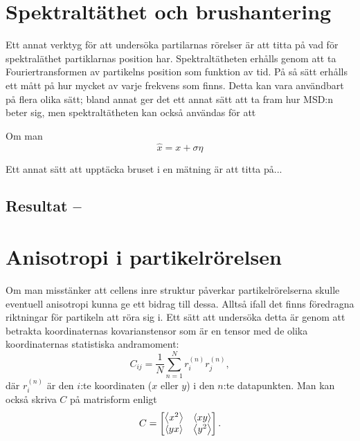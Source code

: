 \section{Spektraltäthet och brushantering}
Ett annat verktyg för att undersöka partilarnas rörelser är att titta på vad för spektraläthet partiklarnas position har. Spektraltätheten erhålls genom att ta Fouriertransformen av partikelns position som funktion av tid. På så sätt erhålls ett mått på hur mycket av varje frekvens som finns. Detta kan vara användbart på flera olika sätt; bland annat ger det ett annat sätt att ta fram hur MSD:n beter sig, men spektraltätheten kan också användas för att 

Om man 
\begin{equation}
\hat{x} = x + \sigma\eta
\end{equation}



Ett annat sätt att upptäcka bruset i en mätning är att titta på...


\subsection{Resultat -- }



\section{Anisotropi i partikelrörelsen}
Om man misstänker att cellens inre struktur påverkar partikelrörelserna skulle eventuell anisotropi kunna ge ett bidrag till dessa. Alltså ifall det finns föredragna riktningar för partikeln att röra sig i. Ett sätt att undersöka detta är genom att betrakta koordinaternas kovarianstensor som är en tensor med de olika koordinaternas statistiska andramoment:
\begin{equation}
C_{ij} = \frac{1}{N} \sum_{n=1}^{N} r_i^{(n)}r_j^{(n)},
\end{equation}
där $r_i^{(n)}$ är den $i$:te koordinaten ($x$ eller $y$) i den $n$:te datapunkten. Man kan också skriva $C$ på matrisform enligt
\begin{equation}
C=
\begin{bmatrix} \label{eq:C_matrix}
\ev{x^2} & \ev{xy}\\
\ev{yx} & \ev{y^2}
\end{bmatrix}.
\end{equation}

